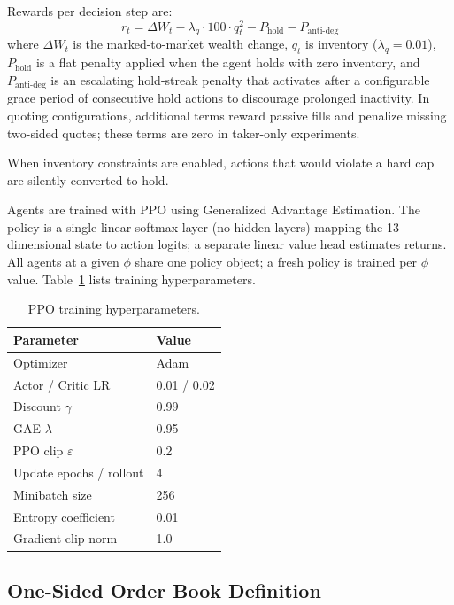 \documentclass[sigconf]{acmart}
\begin{document}
Rewards per decision step are:
\begin{equation}
r_t = \Delta W_t - \lambda_q \cdot 100 \cdot q_t^2 - P_{\text{hold}} - P_{\text{anti-deg}}
\label{eq:reward}
\end{equation}
where $\Delta W_t$ is the marked-to-market wealth change, $q_t$ is inventory ($\lambda_q = 0.01$), $P_{\text{hold}}$ is a flat penalty applied when the agent holds with zero inventory, and $P_{\text{anti-deg}}$ is an escalating hold-streak penalty that activates after a configurable grace period of consecutive hold actions to discourage prolonged inactivity. In quoting configurations, additional terms reward passive fills and penalize missing two-sided quotes; these terms are zero in taker-only experiments.

When inventory constraints are enabled, actions that would violate a hard cap are silently converted to hold.

Agents are trained with PPO using Generalized Advantage Estimation. The policy is a single linear softmax layer (no hidden layers) mapping the 13-dimensional state to action logits; a separate linear value head estimates returns. All agents at a given $\phi$ share one policy object; a fresh policy is trained per $\phi$ value. Table~\ref{tab:hyperparams} lists training hyperparameters.

\begin{table}[htbp]
\caption{PPO training hyperparameters.}
\label{tab:hyperparams}
\begin{tabular}{ll}
\toprule
Parameter & Value \\
\midrule
Optimizer & Adam \\
Actor / Critic LR & 0.01 / 0.02 \\
Discount $\gamma$ & 0.99 \\
GAE $\lambda$ & 0.95 \\
PPO clip $\varepsilon$ & 0.2 \\
Update epochs / rollout & 4 \\
Minibatch size & 256 \\
Entropy coefficient & 0.01 \\
Gradient clip norm & 1.0 \\
\bottomrule
\end{tabular}
\end{table}

\subsection{One-Sided Order Book Definition}
\end{document}
